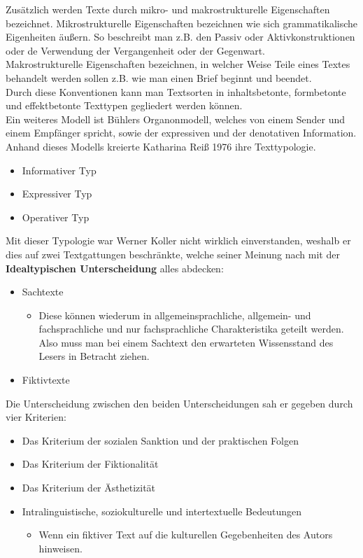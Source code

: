 \documentclass{article}
\begin{document}
	Zusätzlich werden Texte durch mikro- und makrostrukturelle Eigenschaften bezeichnet. Mikrostrukturelle Eigenschaften bezeichnen wie sich grammatikalische Eigenheiten äußern. So beschreibt man z.B. den Passiv oder Aktivkonstruktionen oder de Verwendung der Vergangenheit oder der Gegenwart. \\
	Makrostrukturelle Eigenschaften bezeichnen, in welcher Weise Teile eines Textes behandelt werden sollen z.B. wie man einen Brief beginnt und beendet. \\
	Durch diese Konventionen kann man Textsorten in inhaltsbetonte, formbetonte und effektbetonte Texttypen gegliedert werden können. \\
	Ein weiteres Modell ist Bühlers Organonmodell, welches von einem Sender und einem Empfänger spricht, sowie der expressiven und der denotativen Information. Anhand dieses Modells kreierte Katharina Reiß 1976 ihre Texttypologie. \\
	\begin{itemize}
		\item{Informativer Typ}
		\item{Expressiver Typ}
		\item{Operativer Typ}
	\end{itemize}

	Mit dieser Typologie war Werner Koller nicht wirklich einverstanden, weshalb er dies auf zwei Textgattungen beschränkte, welche seiner Meinung nach mit der \textbf{Idealtypischen Unterscheidung} alles abdecken:
	\begin{itemize}
		\item{Sachtexte}
		\begin{itemize}
			\item{Diese können wiederum in allgemeinsprachliche, allgemein- und fachsprachliche und nur fachsprachliche Charakteristika geteilt werden. Also muss man bei einem Sachtext den erwarteten Wissensstand des Lesers in Betracht ziehen.}
		\end{itemize}
		\item{Fiktivtexte}
	\end{itemize}

	Die Unterscheidung zwischen den beiden Unterscheidungen sah er gegeben durch vier Kriterien:
	\begin{itemize}
		\item{Das Kriterium der sozialen Sanktion und der praktischen Folgen}
		\item{Das Kriterium der Fiktionalität}
		\item{Das Kriterium der Ästhetizität}
		\item{Intralinguistische, soziokulturelle und intertextuelle Bedeutungen}
		\begin{itemize}
			\item{Wenn ein fiktiver Text auf die kulturellen Gegebenheiten des Autors hinweisen.}
		\end{itemize}
	\end{itemize}
\end{document}
